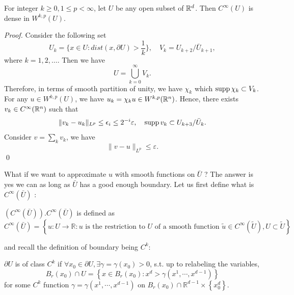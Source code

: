 \begin{theorem}
 For integer $k\ge 0, 1\le p < \infty$, let $U$ be any open subset of $\mathbb{R}^d$. Then $C^\infty(U)$ is dense in $W^{k,p}(U)$. 
\end{theorem}
\begin{proof}
    Consider the following set 
    \[
        U_k = \{x\in U: dist(x,\partial U) > \frac{1}{k}\}, \quad V_k = U_{k+2}/\bar{U}_{k+1},
    \]
    where $k=1,2, \dots$. Then we have 
    \[
        U = \bigcup_{k=0}^\infty V_k.
    \]
    Therefore, in terms of smooth partition of unity, we have $\chi_k$ which $\operatorname{{\rm supp}} \chi_k \subset V_k$. For any $u\in W^{k,p}(U)$, we have $u_k = \chi_k u \in W^{k,p}(\mathbb{R}^n)$. Hence, there exists $v_{k}\in C^\infty(\mathbb{R}^n)$ such that 
    \[
        \|v_{k} - u_k \|_{L^p} \le \epsilon_i \le 2^{-i}\varepsilon, \quad \operatorname{{\rm supp}} v_{k}\subset U_{k+3}/\bar{U}_{k}. 
    \]
    Consider $v = \sum_{k} v_k$, we have 
    \[
        \|v-u\|_{L^p} \le \varepsilon.
    \]
    \qed 
\end{proof}

What if we want to approximate $u$ with smooth functions on $\bar{U}$ ? The answer is yes we can as long as $\bar{U}$ has a good enough boundary. Let us first define what is $C^{\infty}(\bar{U})$ :

\begin{definition}
$\left(C^{\infty}(\bar{U})\right) . C^{\infty}(\bar{U})$ is defined as
$$
C^{\infty}(\bar{U})=\left\{u: U \rightarrow \mathbb{R}: u \text { is the restriction to } U \text { of a smooth function } \tilde{u} \in C^{\infty}(\tilde{U}), U \subset \tilde{U}\right\}
$$ 
\end{definition}

and recall the definition of boundary being $C^{k}$:

\begin{definition}
[$C^k$ boundary]$\partial U$ is of class $C^{k}$ if $\forall x_{0} \in \partial U, \exists \gamma=\gamma\left(x_{0}\right)>0$, s.t. up to relabeling the variables,
$$
B_{r}\left(x_{0}\right) \cap U=\left\{x \in B_{r}\left(x_{0}\right): x^{d}>\gamma\left(x^{1}, \cdots, x^{d-1}\right)\right\}
$$
for some $C^{k}$ function $\gamma=\gamma\left(x^{1}, \cdots, x^{d-1}\right)$ on $B_{r}\left(x_{0}\right) \cap \mathbb{R}^{d-1} \times\left\{x_{0}^{d}\right\}$.
\end{definition}

